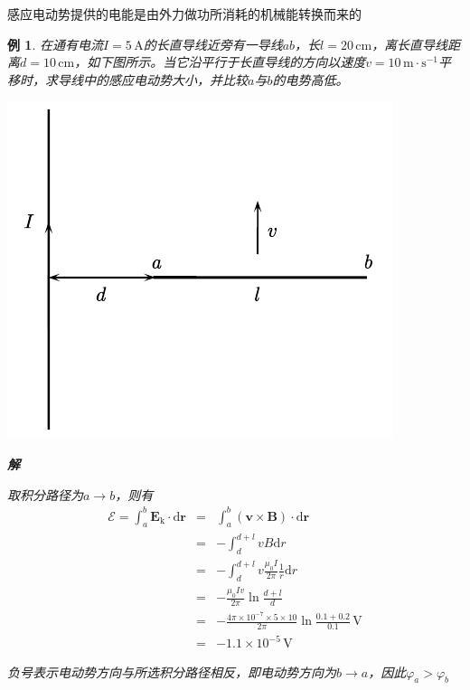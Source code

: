 \documentclass[12pt, a4paper, twoside]{ctexbook}
\newtheorem{example}[theorem]{例}
\begin{document}
感应电动势提供的电能是由外力做功所消耗的机械能转换而来的
\begin{example}
    在通有电流$I=5\,\mathrm{A}$的长直导线近旁有一导线$ab$，长$l=20\,\mathrm{cm}$，离长直导线距离$d=10\,\mathrm{cm}$，如下图所示。当它沿平行于长直导线的方向以速度$v=10\,\mathrm{m}\cdot\mathrm{s}^{-1}$平移时，求导线中的感应电动势大小，并比较$a$与$b$的电势高低。
    \begin{center}
        \includegraphics[scale=0.90]{CH11EX01}
    \end{center}

    \noindent\textbf{解}

    取积分路径为$a\to b$，则有
    \begin{eqnarray}
        \mathscr{E}=\int_{a}^{b}\boldsymbol{E}_\mathrm{k}\cdot\mathrm{d}\boldsymbol{r}&=&\int_{a}^{b}\left(\boldsymbol{v}\times\boldsymbol{B}\right)\cdot\mathrm{d}\boldsymbol{r} \nonumber \\
        ~&=&-\int_{d}^{d+l}vB\mathrm{d}r \nonumber \\
        ~&=&-\int_{d}^{d+l}v\frac{\mu_0I}{2\pi}\frac{1}{r}\mathrm{d}r \nonumber \\
        ~&=&-\frac{\mu_0Iv}{2\pi}\ln\frac{d+l}{d} \nonumber \\
        ~&=&-\frac{4\pi\times10^{-7}\times5\times10}{2\pi}\ln\frac{0.1+0.2}{0.1}\,\mathrm{V} \nonumber \\
        ~&=&-1.1\times10^{-5}\,\mathrm{V} \nonumber
    \end{eqnarray}

    负号表示电动势方向与所选积分路径相反，即电动势方向为$b\to a$，因此$\varphi_a>\varphi_b$
\end{example}
\end{document}

